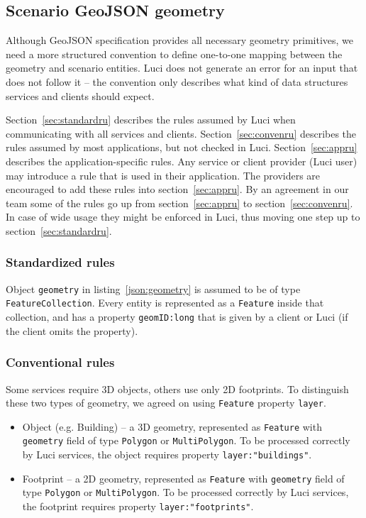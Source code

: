 \subsection{Scenario GeoJSON geometry}
\label{sec:services:scenario}

Although GeoJSON specification provides all necessary geometry primitives,
we need a more structured convention to define one-to-one mapping between the geometry and scenario entities.
\ac{Luci} does not generate an error for an input that does not follow it -- the convention only describes what kind of data structures services and clients should expect.

Section~\ref{sec:standardru} describes the rules assumed by \ac{Luci} when communicating with all services and clients.
Section~\ref{sec:convenru} describes the rules assumed by most applications, but not checked in \ac{Luci}.
Section~\ref{sec:appru} describes the application-specific rules.
Any service or client provider (\ac{Luci} user) may introduce a rule that is used in their application.
The providers are encouraged to add these rules into section~\ref{sec:appru}.
By an agreement in our team some of the rules go up from section~\ref{sec:appru} to section~\ref{sec:convenru}.
In case of wide usage they might be enforced in \ac{Luci}, thus moving one step up to section~\ref{sec:standardru}.

\subsubsection{Standardized rules}
\label{sec:services:standardru}


Object \texttt{geometry} in listing~\ref{json:geometry} is assumed to be of type \texttt{FeatureCollection}.
Every entity is represented as a \texttt{Feature} inside that collection, and has a property \texttt{geomID:\color{blue}long} that is given by a client or \ac{Luci} (if the client omits the property).

\subsubsection{Conventional rules}
\label{sec:services:convenru}

Some services require 3D objects, others use only 2D footprints.
To distinguish these two types of geometry, we agreed on using \texttt{Feature} property \texttt{layer}.
\begin{itemize}
\item Object (e.g. Building) -- a 3D geometry, represented as \texttt{Feature} with \texttt{geometry} field of type \texttt{Polygon} or \texttt{MultiPolygon}.
To be processed correctly by \ac{Luci} services, the object requires property \texttt{layer:\color{red}"buildings"}.
%
\item Footprint -- a 2D geometry, represented as \texttt{Feature} with \texttt{geometry}
field of type \texttt{Polygon} or \texttt{MultiPolygon}.
To be processed correctly by \ac{Luci} services, the footprint requires property \texttt{layer:\color{red}"footprints"}.
\end{itemize}


